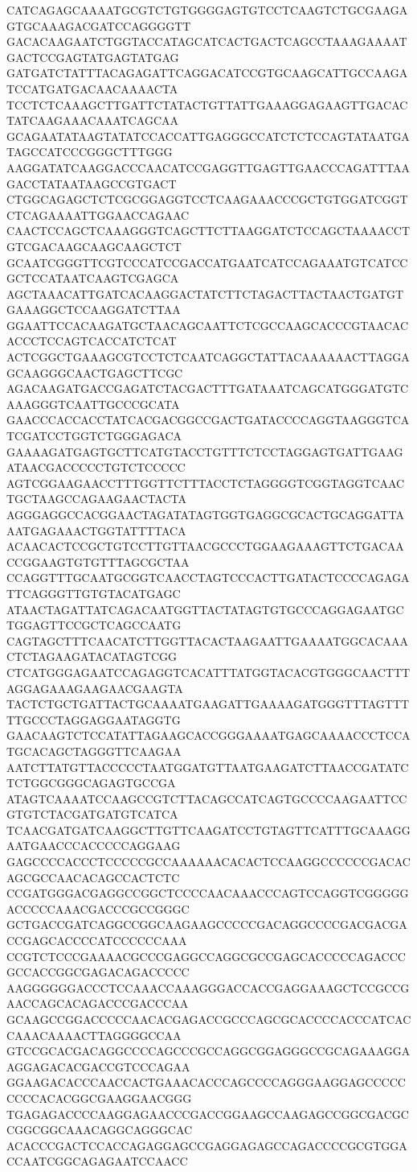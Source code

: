 CATCAGAGCAAAATGCGTCTGTGGGGAGTGTCCTCAAGTCTGCGAAGAGTGCAAAGACGATCCAGGGGTT
GACACAAGAATCTGGTACCATAGCATCACTGACTCAGCCTAAAGAAAATGACTCCGAGTATGAGTATGAG
GATGATCTATTTACAGAGATTCAGGACATCCGTGCAAGCATTGCCAAGATCCATGATGACAACAAAACTA
TCCTCTCAAAGCTTGATTCTATACTGTTATTGAAAGGAGAAGTTGACACTATCAAGAAACAAATCAGCAA
GCAGAATATAAGTATATCCACCATTGAGGGCCATCTCTCCAGTATAATGATAGCCATCCCGGGCTTTGGG
AAGGATATCAAGGACCCAACATCCGAGGTTGAGTTGAACCCAGATTTAAGACCTATAATAAGCCGTGACT
CTGGCAGAGCTCTCGCGGAGGTCCTCAAGAAACCCGCTGTGGATCGGTCTCAGAAAATTGGAACCAGAAC
CAACTCCAGCTCAAAGGGTCAGCTTCTTAAGGATCTCCAGCTAAAACCTGTCGACAAGCAAGCAAGCTCT
GCAATCGGGTTCGTCCCATCCGACCATGAATCATCCAGAAATGTCATCCGCTCCATAATCAAGTCGAGCA
AGCTAAACATTGATCACAAGGACTATCTTCTAGACTTACTAACTGATGTGAAAGGCTCCAAGGATCTTAA
GGAATTCCACAAGATGCTAACAGCAATTCTCGCCAAGCACCCGTAACACACCCTCCAGTCACCATCTCAT
ACTCGGCTGAAAGCGTCCTCTCAATCAGGCTATTACAAAAAACTTAGGAGCAAGGGCAACTGAGCTTCGC
AGACAAGATGACCGAGATCTACGACTTTGATAAATCAGCATGGGATGTCAAAGGGTCAATTGCCCGCATA
GAACCCACCACCTATCACGACGGCCGACTGATACCCCAGGTAAGGGTCATCGATCCTGGTCTGGGAGACA
GAAAAGATGAGTGCTTCATGTACCTGTTTCTCCTAGGAGTGATTGAAGATAACGACCCCCTGTCTCCCCC
AGTCGGAAGAACCTTTGGTTCTTTACCTCTAGGGGTCGGTAGGTCAACTGCTAAGCCAGAAGAACTACTA
AGGGAGGCCACGGAACTAGATATAGTGGTGAGGCGCACTGCAGGATTAAATGAGAAACTGGTATTTTACA
ACAACACTCCGCTGTCCTTGTTAACGCCCTGGAAGAAAGTTCTGACAACCGGAAGTGTGTTTAGCGCTAA
CCAGGTTTGCAATGCGGTCAACCTAGTCCCACTTGATACTCCCCAGAGATTCAGGGTTGTGTACATGAGC
ATAACTAGATTATCAGACAATGGTTACTATAGTGTGCCCAGGAGAATGCTGGAGTTCCGCTCAGCCAATG
CAGTAGCTTTCAACATCTTGGTTACACTAAGAATTGAAAATGGCACAAACTCTAGAAGATACATAGTCGG
CTCATGGGAGAATCCAGAGGTCACATTTATGGTACACGTGGGCAACTTTAGGAGAAAGAAGAACGAAGTA
TACTCTGCTGATTACTGCAAAATGAAGATTGAAAAGATGGGTTTAGTTTTTGCCCTAGGAGGAATAGGTG
GAACAAGTCTCCATATTAGAAGCACCGGGAAAATGAGCAAAACCCTCCATGCACAGCTAGGGTTCAAGAA
AATCTTATGTTACCCCCTAATGGATGTTAATGAAGATCTTAACCGATATCTCTGGCGGGCAGAGTGCCGA
ATAGTCAAAATCCAAGCCGTCTTACAGCCATCAGTGCCCCAAGAATTCCGTGTCTACGATGATGTCATCA
TCAACGATGATCAAGGCTTGTTCAAGATCCTGTAGTTCATTTGCAAAGGAATGAACCCACCCCCAGGAAG
GAGCCCCACCCTCCCCCGCCAAAAAACACACTCCAAGGCCCCCCGACACAGCGCCAACACAGCCACTCTC
CCGATGGGACGAGGCCGGCTCCCCAACAAACCCAGTCCAGGTCGGGGGACCCCCAAACGACCCGCCGGGC
GCTGACCGATCAGGCCGGCAAGAAGCCCCCGACAGGCCCCGACGACGACCGAGCACCCCATCCCCCCAAA
CCGTCTCCCGAAAACGCCCGAGGCCAGGCGCCGAGCACCCCCAGACCCGCCACCGGCGAGACAGACCCCC
AAGGGGGGACCCTCCAAACCAAAGGGACCACCGAGGAAAGCTCCGCCGAACCAGCACAGACCCGACCCAA
GCAAGCCGGACCCCCAACACGAGACCGCCCAGCGCACCCCACCCATCACCAAACAAAACTTAGGGGCCAA
GTCCGCACGACAGGCCCCAGCCCGCCAGGCGGAGGGCCGCAGAAAGGAAGGAGACACGACCGTCCCAGAA
GGAAGACACCCAACCACTGAAACACCCAGCCCCAGGGAAGGAGCCCCCCCCCACACGGCGAAGGAACGGG
TGAGAGACCCCAAGGAGAACCCGACCGGAAGCCAAGAGCCGGCGACGCCGGCGGCAAACAGGCAGGGCAC
ACACCCGACTCCACCAGAGGAGCCGAGGAGAGCCAGACCCCGCGTGGACCAATCGGCAGAGAATCCAACC
